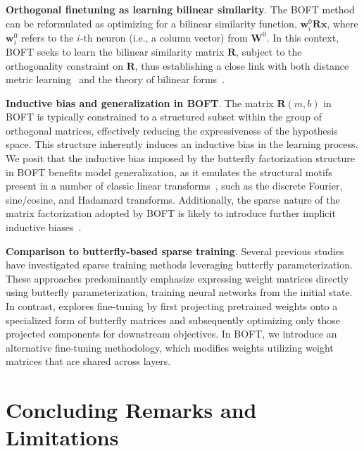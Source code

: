 \textbf{Orthogonal finetuning as learning bilinear similarity}. The BOFT method can be reformulated as optimizing for a bilinear similarity function, $\bm{w}^0_i\bm{R}\bm{x}$, where $\bm{w}^0_i$ refers to the $i$-th neuron (i.e., a column vector) from $\bm{W}^0$. In this context, BOFT seeks to learn the bilinear similarity matrix $\bm{R}$, subject to the orthogonality constraint on $\bm{R}$, thus establishing a close link with both distance metric learning~\cite{xing2002distance} and the theory of bilinear forms~\cite{roman2005advanced}.

\textbf{Inductive bias and generalization in BOFT}. The matrix $\bm{R}(m,b)$ in BOFT is typically constrained to a structured subset within the group of orthogonal matrices, effectively reducing the expressiveness of the hypothesis space. This structure inherently induces an inductive bias in the learning process. We posit that the inductive bias imposed by the butterfly factorization structure in BOFT benefits model generalization, as it emulates the structural motifs present in a number of classic linear transforms~\cite{dao2019kaleidoscope}, such as the discrete Fourier, sine/cosine, and Hadamard transforms. Additionally, the sparse nature of the matrix factorization adopted by BOFT is likely to introduce further implicit inductive biases~\cite{gunasekar2017implicit,li2018algorithmic,liu2019neural}.

\textbf{Comparison to butterfly-based sparse training}. Several previous studies~\cite{dao2019learning,dao2019kaleidoscope,chen2022pixelated,dao2022monarch} have investigated sparse training methods leveraging butterfly parameterization. These approaches predominantly emphasize expressing weight matrices directly using butterfly parameterization, training neural networks from the initial state. In contrast, \cite{dao2022monarch} explores fine-tuning by first projecting pretrained weights onto a specialized form of butterfly matrices and subsequently optimizing only those projected components for downstream objectives. In BOFT, we introduce an alternative fine-tuning methodology, which modifies weights utilizing weight matrices that are shared across layers.



\section{Concluding Remarks and Limitations}

